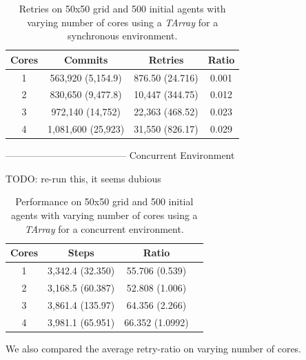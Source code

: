 \begin{table}
	\centering
  	\begin{tabular}{ c || c | c | c }
        Cores & Commits            & Retries         & Ratio \\ \hline \hline 
    	1     & 563,920 (5,154.9)  & 876.50 (24.716) & 0.001 \\ \hline
   		2     & 830,650 (9,477.8)  & 10,447 (344.75) & 0.012 \\ \hline
   		3     & 972,140 (14,752)   & 22,363 (468.52) & 0.023 \\ \hline
   		4     & 1,081,600 (25,923) & 31,550 (826.17) & 0.029 \\ \hline
   	\end{tabular}
  	
  	\caption{Retries on 50x50 grid and 500 initial agents with varying number of cores using a \textit{TArray} for a synchronous environment.}
	\label{tab:tarray_results_syncenv_retries}
\end{table}

--------------------------------------
Concurrent Environment

TODO: re-run this, it seems dubious
\begin{table}
	\centering
  	\begin{tabular}{ c || c | c | c }
        Cores & Steps            & Ratio          \\ \hline \hline 
    	1     & 3,342.4 (32.350) & 55.706 (0.539) \\ \hline
   		2     & 3,168.5 (60.387) & 52.808 (1.006) \\ \hline
   		3     & 3,861.4 (135.97) & 64.356 (2.266) \\ \hline
   		4     & 3,981.1 (65.951) & 66.352 (1.0992) \\ \hline \hline
   	\end{tabular}
  	
  	\caption{Performance on 50x50 grid and 500 initial agents with varying number of cores using a \textit{TArray} for a concurrent environment.}
	\label{tab:tarray_results_concenv_time}
\end{table}

We also compared the average retry-ratio on varying number of cores.

